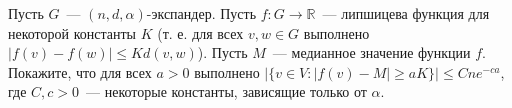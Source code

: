 Пусть $G$~--- $(n, d, \alpha)$-экспандер. Пусть $f: G \rightarrow \mathbb{R}$~--- липшицева функция для некоторой константы
$K$ (т. е. для всех $v, w \in G$ выполнено $|f(v) - f(w)| \le K d(v, w)$). Пусть $M$~--- медианное значение функции
$f$. Покажите, что для всех $a > 0$ выполнено $|\{v \in V: |f(v) - M| \ge a K \}| \le C n e^{-ca}$, где $C, c > 0$~---
некоторые константы, зависящие только от $\alpha$.